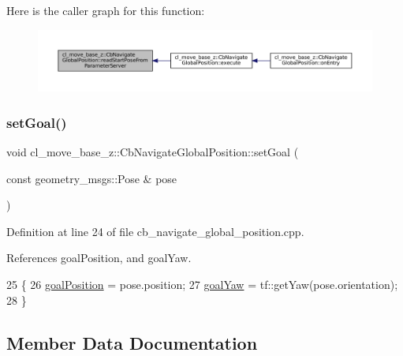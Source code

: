Here is the caller graph for this function\+:
\nopagebreak
\begin{figure}[H]
\begin{center}
\leavevmode
\includegraphics[width=350pt]{classcl__move__base__z_1_1CbNavigateGlobalPosition_a868b25f238e3781c9a2e44b4e1502fcc_icgraph}
\end{center}
\end{figure}
\mbox{\label{classcl__move__base__z_1_1CbNavigateGlobalPosition_a3dc6072628c1e1cdded3d574b3a9766e}} 
\subsubsection{\texorpdfstring{set\+Goal()}{setGoal()}}
{\footnotesize\ttfamily void cl\+\_\+move\+\_\+base\+\_\+z\+::\+Cb\+Navigate\+Global\+Position\+::set\+Goal (\begin{DoxyParamCaption}\item[{const geometry\+\_\+msgs\+::\+Pose \&}]{pose }\end{DoxyParamCaption})}



Definition at line 24 of file cb\+\_\+navigate\+\_\+global\+\_\+position.\+cpp.



References goal\+Position, and goal\+Yaw.


\begin{DoxyCode}
25     \{
26         \hyperlink{classcl__move__base__z_1_1CbNavigateGlobalPosition_a51a0266fd9a63e99f26e88933529c559}{goalPosition} = pose.position;
27         \hyperlink{classcl__move__base__z_1_1CbNavigateGlobalPosition_a839900de7f664b27c9be189fadbaa003}{goalYaw} = tf::getYaw(pose.orientation);
28     \}
\end{DoxyCode}


\subsection{Member Data Documentation}
\mbox{\label{classcl__move__base__z_1_1CbNavigateGlobalPosition_a51a0266fd9a63e99f26e88933529c559}} 

